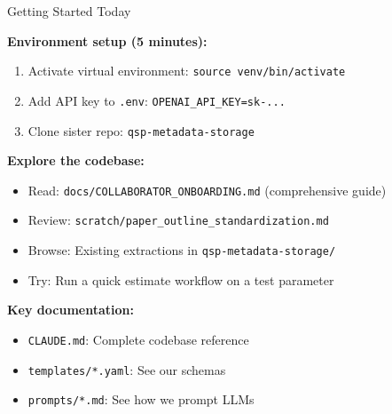 \documentclass[10pt]{beamer}
\begin{document}
\begin{frame}{Getting Started Today}

  \textbf{Environment setup (5 minutes):}
  \begin{enumerate}
    \item Activate virtual environment: \texttt{source venv/bin/activate}
    \item Add API key to \texttt{.env}: \texttt{OPENAI\_API\_KEY=sk-...}
    \item Clone sister repo: \texttt{qsp-metadata-storage}
  \end{enumerate}

  \vspace{0.3cm}

  \textbf{Explore the codebase:}
  \begin{itemize}
    \item Read: \texttt{docs/COLLABORATOR\_ONBOARDING.md} (comprehensive guide)
    \item Review: \texttt{scratch/paper\_outline\_standardization.md}
    \item Browse: Existing extractions in \texttt{qsp-metadata-storage/}
    \item Try: Run a quick estimate workflow on a test parameter
  \end{itemize}

  \vspace{0.3cm}

  \textbf{Key documentation:}
  \begin{itemize}
    \item \texttt{CLAUDE.md}: Complete codebase reference
    \item \texttt{templates/*.yaml}: See our schemas
    \item \texttt{prompts/*.md}: See how we prompt LLMs
  \end{itemize}

\end{frame}
\end{document}
